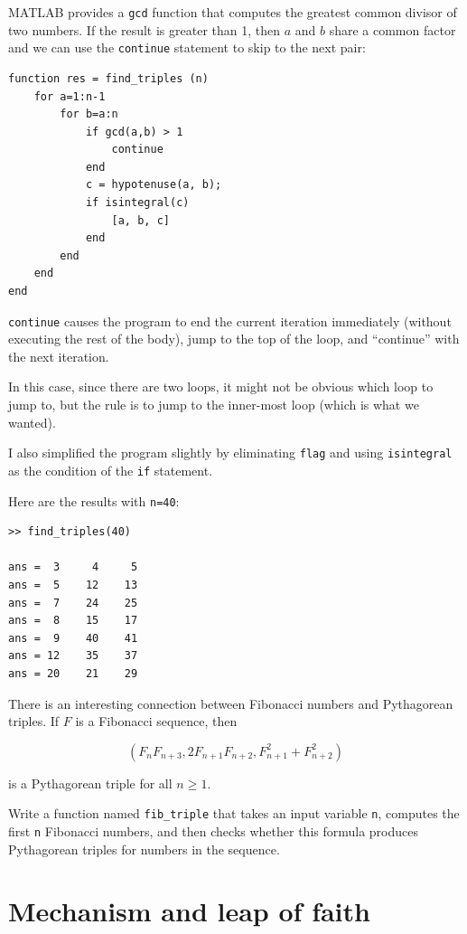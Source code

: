 \documentclass{book}
\begin{document}
MATLAB provides a {\tt gcd} function that computes the greatest common
divisor of two numbers.  If the result is greater than 1, then
$a$ and $b$ share a common factor and we can use the {\tt continue}
statement to skip to the next pair:

\begin{verbatim}
function res = find_triples (n)
    for a=1:n-1
        for b=a:n
            if gcd(a,b) > 1
                continue
            end
            c = hypotenuse(a, b);
            if isintegral(c)
                [a, b, c]
            end
        end
    end
end
\end{verbatim}

{\tt continue} causes the program to end the current iteration
immediately (without executing the rest of the body), jump to
the top of the loop, and ``continue'' with the next iteration.

In this case, since there are two loops, it might not be obvious
which loop to jump to, but the rule is to jump to the inner-most
loop (which is what we wanted).

I also simplified the program slightly by eliminating
{\tt flag} and using {\tt isintegral} as the condition of the
{\tt if} statement.

Here are the results with {\tt n=40}:

\begin{verbatim}
>> find_triples(40)

ans =  3     4     5
ans =  5    12    13
ans =  7    24    25
ans =  8    15    17
ans =  9    40    41
ans = 12    35    37
ans = 20    21    29
\end{verbatim}

There is an interesting connection between Fibonacci numbers and
Pythagorean triples.  If $F$ is a Fibonacci sequence, then

\[ (F_n F_{n+3}, 2 F_{n+1} F_{n+2}, F_{n+1}^2 + F_{n+2}^2 ) \]

is a Pythagorean triple for all $n \ge 1$.

\begin{ex}
Write a function named {\tt fib\_triple} that
takes an input variable {\tt n}, computes
the first {\tt n} Fibonacci numbers, and then checks whether 
this formula produces Pythagorean triples for numbers
in the sequence.
\end{ex}



\section{Mechanism and leap of faith}
\end{document}
